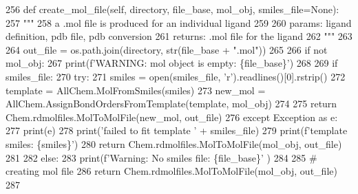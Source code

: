 \begin{DoxyCode}
256     \textcolor{keyword}{def }create\_mol\_file(self, directory, file\_base, mol\_obj, smiles\_file=None):
257         \textcolor{stringliteral}{"""}
258 \textcolor{stringliteral}{        a .mol file is produced for an individual ligand}
259 \textcolor{stringliteral}{}
260 \textcolor{stringliteral}{        params: ligand definition, pdb file, pdb conversion}
261 \textcolor{stringliteral}{        returns: .mol file for the ligand}
262 \textcolor{stringliteral}{        """}
263 
264         out\_file = os.path.join(directory, str(file\_base + \textcolor{stringliteral}{".mol"}))
265 
266         \textcolor{keywordflow}{if} \textcolor{keywordflow}{not} mol\_obj:
267             print(f\textcolor{stringliteral}{'WARNING: mol object is empty: \{file\_base\}'})
268 
269         \textcolor{keywordflow}{if} smiles\_file:
270             \textcolor{keywordflow}{try}:
271                 smiles = open(smiles\_file, \textcolor{stringliteral}{'r').readlines()[0].rstrip()}
272 \textcolor{stringliteral}{                template = AllChem.MolFromSmiles(smiles)}
273 \textcolor{stringliteral}{                new\_mol = AllChem.AssignBondOrdersFromTemplate(template, mol\_obj)}
274 \textcolor{stringliteral}{}
275 \textcolor{stringliteral}{                }\textcolor{keywordflow}{return} Chem.rdmolfiles.MolToMolFile(new\_mol, out\_file)
276             \textcolor{keywordflow}{except} Exception \textcolor{keyword}{as} e:
277                 print(e)
278                 print(\textcolor{stringliteral}{'failed to fit template '} + smiles\_file)
279                 print(f\textcolor{stringliteral}{'template smiles: \{smiles\}'})
280                 \textcolor{keywordflow}{return} Chem.rdmolfiles.MolToMolFile(mol\_obj, out\_file)
281 
282         \textcolor{keywordflow}{else}:
283             print(f\textcolor{stringliteral}{'Warning: No smiles file: \{file\_base\}'} )
284 
285         \textcolor{comment}{# creating mol file}
286         \textcolor{keywordflow}{return} Chem.rdmolfiles.MolToMolFile(mol\_obj, out\_file)
287 
\end{DoxyCode}
\mbox{\label{classfragalysis__api_1_1xcimporter_1_1conversion__pdb__mol_1_1_ligand_ada1d85b43009efb4da6cf5b17c851783}} 
